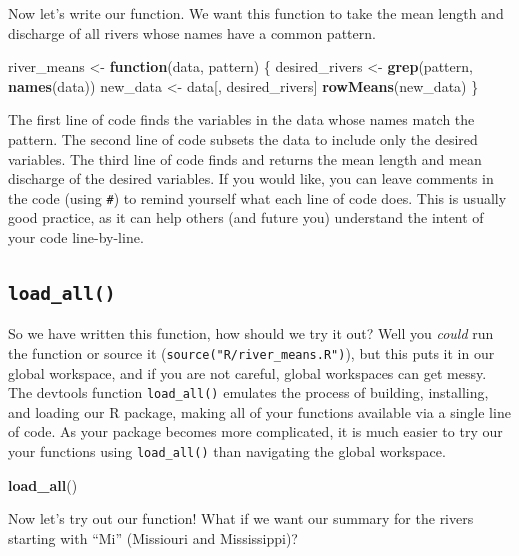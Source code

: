 \documentclass[
]{book}
\newenvironment{Shaded}{\begin{snugshade}}{\end{snugshade}}
\newcommand{\ControlFlowTok}[1]{\textcolor[rgb]{0.13,0.29,0.53}{\textbf{#1}}}
\newcommand{\KeywordTok}[1]{\textcolor[rgb]{0.13,0.29,0.53}{\textbf{#1}}}
\newcommand{\NormalTok}[1]{#1}
\newcommand{\StringTok}[1]{\textcolor[rgb]{0.31,0.60,0.02}{#1}}
\begin{document}
Now let's write our function. We want this function to take the mean length and discharge of all rivers whose names have a common pattern.

\begin{Shaded}
\begin{Highlighting}[]
\NormalTok{river_means <-}\StringTok{ }\ControlFlowTok{function}\NormalTok{(data, pattern) \{}
\NormalTok{  desired_rivers <-}\StringTok{ }\KeywordTok{grep}\NormalTok{(pattern, }\KeywordTok{names}\NormalTok{(data))}
\NormalTok{  new_data <-}\StringTok{ }\NormalTok{data[, desired_rivers]}
  \KeywordTok{rowMeans}\NormalTok{(new_data)}
\NormalTok{\}}
\end{Highlighting}
\end{Shaded}

The first line of code finds the variables in the data whose names match the pattern. The second line of code subsets the data to include only the desired variables. The third line of code finds and returns the mean length and mean discharge of the desired variables. If you would like, you can leave comments in the code (using \texttt{\#}) to remind yourself what each line of code does. This is usually good practice, as it can help others (and future you) understand the intent of your code line-by-line.

\hypertarget{load_all}{%
\subsection{\texorpdfstring{\texttt{load\_all()}}{load\_all()}}\label{load_all}}

So we have written this function, how should we try it out? Well you \emph{could}
run the function or source it (\texttt{source("R/river\_means.R")}), but this puts it in our global workspace, and if you are not careful, global workspaces can get messy. The devtools
function \texttt{load\_all()} emulates the process of building, installing, and loading our R package, making all of your functions available via a single line of code. As your package becomes more complicated, it is much easier to try our your functions using \texttt{load\_all()} than navigating the global workspace.

\begin{Shaded}
\begin{Highlighting}[]
\KeywordTok{load_all}\NormalTok{()}
\end{Highlighting}
\end{Shaded}

Now let's try out our function! What if we want our summary for the rivers starting with ``Mi'' (Missiouri and Mississippi)?
\end{document}

